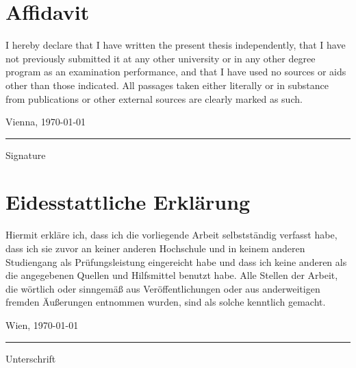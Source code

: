 \documentclass[../../main.tex]{subfiles}
\begin{document}
\section*{Affidavit}

I hereby declare that I have written the present thesis independently, that I have not previously submitted it at any other university or in any other degree program as an examination performance, and that I have used no sources or aids other than those indicated. All passages taken either literally or in substance from publications or other external sources are clearly marked as such.

\vspace{2cm}

Vienna, \englishdateformat\today\hspace{2.5cm}\rule{4.5cm}{0.25pt}

\phantom{Vienna, \englishdateformat\today}\hspace{2.5cm}Signature

\vspace{7cm}

\section*{Eidesstattliche Erklärung}

Hiermit erkläre ich, dass ich die vorliegende Arbeit selbstständig verfasst habe, dass ich sie zuvor an keiner anderen Hochschule und in keinem anderen Studiengang als Prüfungsleistung eingereicht habe und dass ich keine anderen als die angegebenen Quellen und Hilfsmittel benutzt habe. Alle Stellen der Arbeit, die wörtlich oder sinngemäß aus Veröffentlichungen oder aus anderweitigen fremden Äußerungen entnommen wurden, sind als solche kenntlich gemacht. 

\vspace{2cm}

Wien, \germandateformat\today\hspace{2.5cm}\rule{4.5cm}{0.25pt}

\phantom{Wien, \germandateformat\today}\hspace{2.5cm}Unterschrift
\end{document}
